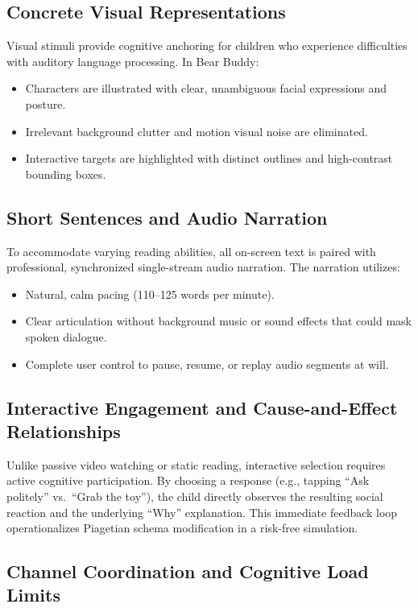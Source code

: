 \subsection{Concrete Visual Representations}

Visual stimuli provide cognitive anchoring for children who experience difficulties with auditory language processing. In Bear Buddy:
\begin{itemize}
    \item Characters are illustrated with clear, unambiguous facial expressions and posture.
    \item Irrelevant background clutter and motion visual noise are eliminated.
    \item Interactive targets are highlighted with distinct outlines and high-contrast bounding boxes.
\end{itemize}

\subsection{Short Sentences and Audio Narration}

To accommodate varying reading abilities, all on-screen text is paired with professional, synchronized single-stream audio narration. The narration utilizes:
\begin{itemize}
    \item Natural, calm pacing (110--125 words per minute).
    \item Clear articulation without background music or sound effects that could mask spoken dialogue.
    \item Complete user control to pause, resume, or replay audio segments at will.
\end{itemize}

\subsection{Interactive Engagement and Cause-and-Effect Relationships}

Unlike passive video watching or static reading, interactive selection requires active cognitive participation. By choosing a response (e.g., tapping ``Ask politely'' vs.\ ``Grab the toy''), the child directly observes the resulting social reaction and the underlying ``Why'' explanation. This immediate feedback loop operationalizes Piagetian schema modification in a risk-free simulation.

\subsection{Channel Coordination and Cognitive Load Limits}

